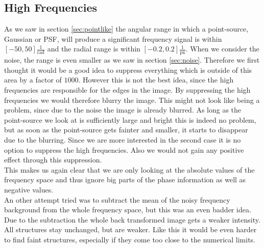 \subsection{High Frequencies}
As we saw in section \ref{sec:pointlike} the angular range in which a point-source, Gaussian or PSF, will produce a significant frequency signal is within $[-50, 50] \frac{1}{\mathrm{rad}}$ and the radial range is within $[-0.2, 0.2] \frac{1}{\mathrm{px}}$. When we consider the noise, the range is even smaller as we saw in section \ref{sec:noise}.  
Therefore we first thought it would be a good idea to suppress everything which is outside of this area by a factor of $1000$. However this is not the best idea, since the high frequencies are responsible for the edges in the image. By suppressing the high frequencies we would therefore blurry the image. This might not look like being a problem, since due to the noise the image is already blurred. As long as the point-source we look at is sufficiently large and bright this is indeed no problem, but as soon as the point-source gets fainter and smaller, it starts to disappear due to the blurring. Since we are more interested in the second case it is no option to suppress the high frequencies. Also we would not gain any positive effect through this suppression.\\
This makes us again clear that we are only looking at the absolute values of the frequency space and thus ignore big parts of the phase information as well as negative values.\\
An other attempt tried was to subtract the mean of the noisy frequency background from the whole frequency space, but this was an even badder idea. Due to the subtraction the whole back transformed image gets a weaker intensity. All structures stay unchanged, but are weaker. Like this it would be even harder to find faint structures, especially if they come too close to the numerical limits. 


